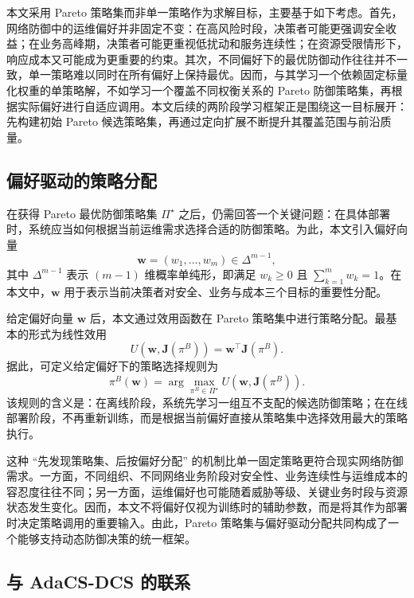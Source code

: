 \documentclass[12pt,a4paper]{article}
\begin{document}
本文采用 Pareto 策略集而非单一策略作为求解目标，主要基于如下考虑。首先，网络防御中的运维偏好并非固定不变：在高风险时段，决策者可能更强调安全收益；在业务高峰期，决策者可能更重视低扰动和服务连续性；在资源受限情形下，响应成本又可能成为更重要的约束。其次，不同偏好下的最优防御动作往往并不一致，单一策略难以同时在所有偏好上保持最优。因而，与其学习一个依赖固定标量化权重的单策略解，不如学习一个覆盖不同权衡关系的 Pareto 防御策略集，再根据实际偏好进行自适应调用。本文后续的两阶段学习框架正是围绕这一目标展开：先构建初始 Pareto 候选策略集，再通过定向扩展不断提升其覆盖范围与前沿质量。

\subsection{偏好驱动的策略分配}

在获得 Pareto 最优防御策略集 $\Pi^\star$ 之后，仍需回答一个关键问题：在具体部署时，系统应当如何根据当前运维需求选择合适的防御策略。为此，本文引入偏好向量
\begin{equation}
\mathbf{w} = (w_1,\dots,w_m)\in \Delta^{m-1},
\end{equation}
其中 $\Delta^{m-1}$ 表示 $(m-1)$ 维概率单纯形，即满足 $w_k \ge 0$ 且 $\sum_{k=1}^{m} w_k = 1$。在本文中，$\mathbf{w}$ 用于表示当前决策者对安全、业务与成本三个目标的重要性分配。

给定偏好向量 $\mathbf{w}$ 后，本文通过效用函数在 Pareto 策略集中进行策略分配。最基本的形式为线性效用
\begin{equation}
U(\mathbf{w}, \mathbf{J}(\pi^B))
=
\mathbf{w}^{\top}\mathbf{J}(\pi^B).
\end{equation}
据此，可定义给定偏好下的策略选择规则为
\begin{equation}
\pi^B(\mathbf{w})
=
\arg\max_{\pi^B \in \Pi^\star}
U(\mathbf{w}, \mathbf{J}(\pi^B)).
\end{equation}
该规则的含义是：在离线阶段，系统先学习一组互不支配的候选防御策略；在在线部署阶段，不再重新训练，而是根据当前偏好直接从策略集中选择效用最大的策略执行。

这种 ``先发现策略集、后按偏好分配'' 的机制比单一固定策略更符合现实网络防御需求。一方面，不同组织、不同网络业务阶段对安全性、业务连续性与运维成本的容忍度往往不同；另一方面，运维偏好也可能随着威胁等级、关键业务时段与资源状态发生变化。因而，本文不将偏好仅视为训练时的辅助参数，而是将其作为部署时决定策略调用的重要输入。由此，Pareto 策略集与偏好驱动分配共同构成了一个能够支持动态防御决策的统一框架。

\subsection{与 AdaCS-DCS 的联系}
\end{document}
